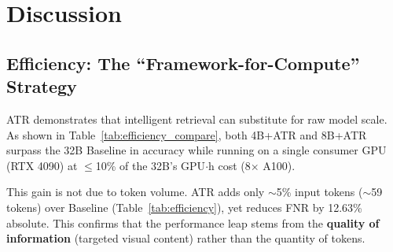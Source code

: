 \section{Discussion}
\label{sec:discussion}

\subsection{Efficiency: The ``Framework-for-Compute'' Strategy}

ATR demonstrates that intelligent retrieval can substitute for raw model scale. As shown in Table~\ref{tab:efficiency_compare}, both 4B+ATR and 8B+ATR surpass the 32B Baseline in accuracy while running on a single consumer GPU (RTX 4090) at $\leq$10\% of the 32B's GPU$\cdot$h cost (8$\times$ A100).

\begin{table}[t]
  \centering
  \caption{Efficiency: ATR configurations vs.\ 32B Baseline (1$\times$ RTX~4090 unless noted).}
  \label{tab:efficiency_compare}
\end{table}

This gain is not due to token volume. ATR adds only $\sim$5\% input tokens ($\sim$59 tokens) over Baseline (Table~\ref{tab:efficiency}), yet reduces FNR by 12.63\% absolute. This confirms that the performance leap stems from the \textbf{quality of information} (targeted visual content) rather than the quantity of tokens.

\begin{table}[t]
  \centering
  \caption{Token overhead (4B+Minimal, full 1900-video run, avg.\ input tokens).}
  \label{tab:efficiency}
\end{table}

